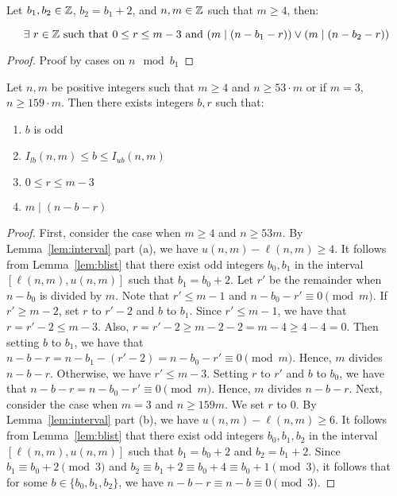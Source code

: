 \begin{lemma}[res b r]
    \label{lemma:res_b_r}
    \leanok

    Let $b_1,b_2\in\mathbb{Z}$, $b_2 = b_1 + 2$, and $n,m\in\mathbb{Z}$ such that $m \geq 4$, then:

    \[
        \exists\ r\in \mathbb{Z}\text{ such that } 0 \leq r \leq m - 3\text{ and } (m \mid (n - b_1 - r)) \lor (m \mid (n - b_2 - r))
    \]
\end{lemma}

\begin{proof}
    Proof by cases on $n \mod b_1$
\end{proof}

\begin{lemma}[b r]
    \label{lemma:b_r}
    \leanok
    Let $n,m$ be positive integers such that $m \geq 4$ and $n \geq 53\cdot m$ or if $m = 3$, $n \geq 159\cdot m$. Then there exists integers $b,r$ such that:

    \begin{enumerate}
        \item $b$ is odd
        \item $I_{lb}(n,m) \leq b \leq I_{ub}(n,m)$
        \item $0 \leq r \leq m - 3$
        \item $m \mid (n - b - r)$
    \end{enumerate}
\end{lemma}

\begin{proof}
    \leanok
    First, consider the case when $m \geq 4$ and $n \geq 53m$.
  By Lemma~\ref{lem:interval} part (a), we have $u(n,m) - \ell(n,m) \geq 4.$
  It follows from Lemma~\ref{lem:blist} that there exist odd integers
  $b_0, b_1$ in the interval $[\ell(n,m), u(n,m)]$ such that $b_1 = b_0+2$.
  Let $r'$ be the remainder when $n - b_0$ is divided by $m$.
  Note that $r' \leq m - 1$ and $n - b_0 - r' \equiv 0 \pmod{m}.$
  If $r' \geq m - 2$, set $r$ to $r'-2$ and $b$ to $b_1$.
  Since $r' \leq m-1$, we have that $r = r' - 2 \leq m - 3$.
  Also, $r = r'-2 \geq m-2-2 = m - 4 \geq 4 - 4 = 0$.
  Then setting $b$ to $b_1$, we have that
  $n - b - r = n - b_1 - (r'-2)
  = n - b_0 - r' \equiv 0 \pmod{m}$.
  Hence, $m$ divides $n - b - r$.
  Otherwise, we have $r' \leq m - 3$. Setting $r$ to $r'$ and $b$ to $b_0$,
  we have that $n - b - r = n - b_0 - r' \equiv 0 \pmod{m}.$
  Hence, $m$ divides $n - b - r$.
  Next, consider the case when $m = 3$ and $n \geq 159m$. We set $r$ to 0.
  By Lemma~\ref{lem:interval} part (b), we have $u(n,m) - \ell(n,m) \geq 6.$
  It follows from Lemma~\ref{lem:blist} that there exist odd integers $b_0,
  b_1, b_2$ in the interval $[\ell(n,m), u(n,m)]$ such that $b_1 = b_0+2$ and
  $b_2 = b_1 + 2$.
  Since $b_1 \equiv b_0 + 2 \pmod{3}$ and
  $b_2 \equiv b_1 + 2 \equiv b_0 + 4 \equiv b_0 + 1 \pmod{3}$, it follows that
  for some $b \in \{b_0, b_1,b_2\}$, we have
  $n - b - r \equiv n - b \equiv 0 \pmod{3}$.
\end{proof}



